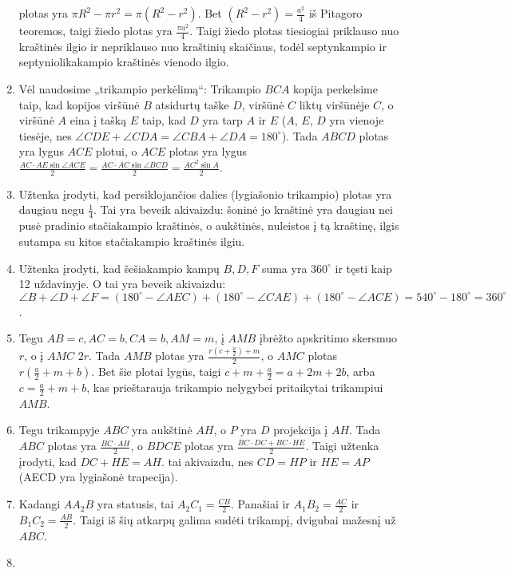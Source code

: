 \begin{enumerate}
  plotas yra $\pi R^2 - \pi r^2 = \pi (R^2-r^2)$. Bet $(R^2
  - r^2) = \frac{a^2}{4}$ iš Pitagoro teoremos, taigi žiedo
  plotas yra $\frac{\pi a^2}{4}$. Taigi žiedo plotas
  tiesiogiai priklauso nuo kraštinės ilgio ir nepriklauso
  nuo kraštinių skaičiaus, todėl septynkampio ir
  septyniolikakampio kraštinės vienodo ilgio. 
\item
  Vėl naudosime „trikampio perkėlimą“: Trikampio $BCA$
  kopija perkelsime taip, kad kopijos viršūnė $B$ atsidurtų
  taške $D$, viršūnė $C$ liktų viršūnėje $C$, o viršūnė $A$
  eina į tašką $E$ taip, kad $D$ yra tarp $A$ ir $E$ ($A$,
  $E$, $D$ yra vienoje tiesėje, nes $\angle CDE + \angle
  CDA = \angle CBA + \angle DA = 180^\circ$). Tada $ABCD$
  plotas yra lygus $ACE$ plotui, o $ACE$ plotas yra lygus
  $\frac{AC\cdot AE\sin \angle ACE}{2} = \frac{AC\cdot AC
  \sin\angle BCD}{2} = \frac{AC^2 \sin A}{2}$.
\item
  Užtenka įrodyti, kad persiklojančios dalies (lygiašonio
  trikampio) plotas yra daugiau negu $\frac{1}{4}$. Tai yra
  beveik akivaizdu: šoninė jo kraštinė yra daugiau nei pusė
  pradinio stačiakampio kraštinės, o aukštinės, nuleistos į
  tą kraštinę, ilgis sutampa su kitos stačiakampio
  kraštinės ilgiu.
\item
  Užtenka įrodyti, kad šešiakampio kampų $B, D, F$ suma yra
  $360^\circ$ ir tęsti kaip 12 uždavinyje. O tai yra beveik
  akivaizdu: $\angle B + \angle D + \angle F = (180^\circ -
  \angle AEC) + (180^\circ - \angle CAE) + (180^\circ -
  \angle ACE) = 540^\circ - 180^\circ = 360^\circ$.
\item
  Tegu $AB = c, AC = b, CA = b, AM = m$, į $AMB$ įbrėžto
  apskritimo skersmuo $r$, o į $AMC$ $2r$. Tada $AMB$
  plotas yra $\frac{r(c+\frac{a}{2})+m}{2}$, o $AMC$ plotas
  $r(\frac{a}{2} + m + b)$. Bet šie plotai lygūs, taigi $c
  + m + \frac{a}{2} = a + 2m + 2b$, arba $c = \frac{a}{2} +
  m + b$, kas prieštarauja trikampio nelygybei pritaikytai
  trikampiui $AMB$.
\item
  Tegu trikampyje $ABC$ yra aukštinė $AH$, o $P$ yra $D$
  projekcija į $AH$. Tada $ABC$ plotas yra $\frac{BC\cdot
  AH}{2}$, o $BDCE$ plotas yra $\frac{BC\cdot DC+BC\cdot
  HE}{2}$. Taigi užtenka įrodyti, kad $DC + HE = AH$. tai
  akivaizdu, nes $CD = HP$ ir $HE = AP$ (AECD yra lygiašonė
  trapecija).
\item
  Kadangi $AA_2B$ yra statusis, tai $A_2C_1 =
  \frac{CB}{2}$.  Panašiai ir $A_1B_2 = \frac{AC}{2}$ ir
  $B_1C_2 = \frac{AB}{2}$. Taigi iš šių atkarpų galima
  sudėti trikampį, dvigubai mažesnį už $ABC$.
\item

\end{enumerate}
